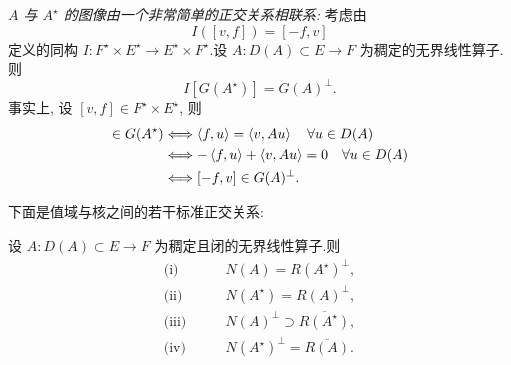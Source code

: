 \emph{$A$ 与 $A^\star$ 的图像由一个非常简单的正交关系相联系:} 考虑由
\begin{equation*}
I([v,f])=[-f,v]
\end{equation*}
定义的同构 $I:F^\star\times E^\star\to E^\star\times F^\star$.设
$A:D(A)\subset E\to F$ 为稠定的无界线性算子.则
\begin{equation*}
\boxed{I[G(A^\star)]=G(A)^\perp.}
\end{equation*}
事实上, 设 $[v,f]\in F^\star\times E^\star$, 则
\begin{align*}
[v,f]\in G(A^\star)
&\Longleftrightarrow \dual{f}{u}=\dual{v}{Au}\quad \forall u\in D(A)\\
&\Longleftrightarrow -\dual{f}{u}+\dual{v}{Au}=0\quad \forall u\in D(A)\\
&\Longleftrightarrow [-f,v]\in G(A)^\perp.
\end{align*}

下面是值域与核之间的若干标准正交关系:

\begin{corollary}
\label{cor:2.18}
设 $A:D(A)\subset E\to F$ 为稠定且闭的无界线性算子.则
\begin{align*}
\text{(i)}\qquad &N(A)=R(A^\star)^\perp,\\
\text{(ii)}\qquad &N(A^\star)=R(A)^\perp,\\
\text{(iii)}\qquad &N(A)^\perp\supset\overline{R(A^\star)},\\
\text{(iv)}\qquad &N(A^\star)^\perp=\overline{R(A)}.
\end{align*}
\end{corollary}

